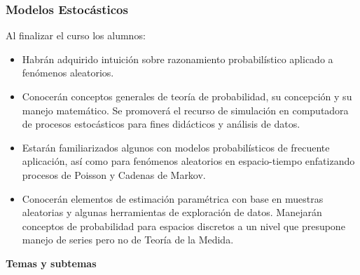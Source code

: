 \documentclass[10pt,a4paper]{article}
\begin{document}
\newpage

\subsubsection{Modelos Estocásticos}

Al finalizar el curso los alumnos:
\begin{itemize}
	\item Habrán adquirido intuición sobre razonamiento probabilístico aplicado a fenómenos aleatorios.
	\item Conocerán conceptos generales de teoría de probabilidad, su concepción y su manejo matemático. Se promoverá el recurso de simulación en computadora de procesos estocásticos para fines didácticos y análisis de datos.
	\item Estarán familiarizados algunos con modelos probabilísticos de frecuente aplicación, así como para fenómenos aleatorios en espacio-tiempo enfatizando procesos de Poisson y Cadenas de Markov.
	\item Conocerán elementos de estimación paramétrica con base en muestras aleatorias y algunas herramientas de exploración de datos. Manejarán conceptos de probabilidad para espacios discretos a un nivel que presupone manejo de series pero no de Teoría de la Medida.
\end{itemize}


\textbf{Temas y subtemas}
\end{document}
